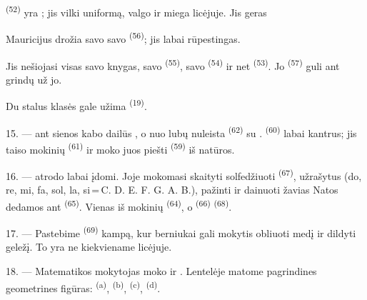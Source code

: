  \textsuperscript{(52)} yra ; jis vilki uniformą,
valgo ir miega licėjuje. Jis geras 

Mauricijus drožia savo  savo 
\textsuperscript{(56)}; jis labai rūpestingas.

Jis nešiojasi visas savo knygas, savo  \textsuperscript{(55)}, savo
 \textsuperscript{(54)} ir net 
\textsuperscript{(53)}. Jo  \textsuperscript{(57)} guli ant
grindų už jo.

Du stalus klasės gale užima  \textsuperscript{(19)}.

\VUsaut{4.6mm}
\VUsaut{3.4mm}

15. ---  ant sienos kabo dailūs , o nuo
lubų nuleista  \textsuperscript{(62)} su .
 \textsuperscript{(60)} labai kantrus; jis taiso mokinių
 \textsuperscript{(61)} ir moko juos piešti 
\textsuperscript{(59)} iš natūros.

16. ---  atrodo labai įdomi. Joje mokomasi skaityti
 solfedžiuoti  \textsuperscript{(67)}, užrašytus
 (do, re, mi, fa, sol, la,
si\,=\,C. D. E. F. G. A. B.), pažinti  ir dainuoti žavias
 Natos dedamos ant  \textsuperscript{(65)}. Vienas iš
mokinių  \textsuperscript{(64)}, o 
\textsuperscript{(66)}  \textsuperscript{(68)}.

17. --- Pastebime  \textsuperscript{(69)} 
kampą, kur berniukai gali mokytis obliuoti medį ir dildyti geležį. To yra ne
kiekviename licėjuje.

\VUsaut{5.0mm}
\VUsaut{3.6mm}

18. --- Matematikos mokytojas moko   ir . Lentelėje matome pagrindines
geometrines figūras:  \textsuperscript{(a)}, 
\textsuperscript{(b)},  \textsuperscript{(c)}, 
\textsuperscript{(d)}.

